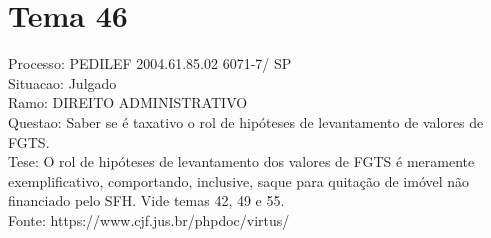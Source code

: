 \documentclass[12pt]{article}
\begin{document}
\section*{Tema 46}
Processo: PEDILEF 2004.61.85.02 6071-7/ SP\\
Situacao: Julgado\\
Ramo: DIREITO ADMINISTRATIVO\\
Questao: Saber se é taxativo o rol de hipóteses de levantamento de valores de FGTS.\\
Tese: O rol de hipóteses de levantamento dos valores de FGTS é meramente exemplificativo, comportando, inclusive, saque para quitação de imóvel não financiado pelo SFH. Vide temas 42, 49 e 55.\\
Fonte: https://www.cjf.jus.br/phpdoc/virtus/
\end{document}

